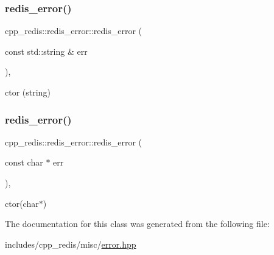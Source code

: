 \subsubsection{\texorpdfstring{redis\+\_\+error()}{redis\_error()}\hspace{0.1cm}{\footnotesize\ttfamily [1/2]}}
{\footnotesize\ttfamily cpp\+\_\+redis\+::redis\+\_\+error\+::redis\+\_\+error (\begin{DoxyParamCaption}\item[{const std\+::string \&}]{err }\end{DoxyParamCaption})\hspace{0.3cm}{\ttfamily [inline]}, {\ttfamily [explicit]}}



ctor (string) 

\mbox{\label{classcpp__redis_1_1redis__error_a0ced25483119c2318b1a5a69cac1919f}} 
\subsubsection{\texorpdfstring{redis\+\_\+error()}{redis\_error()}\hspace{0.1cm}{\footnotesize\ttfamily [2/2]}}
{\footnotesize\ttfamily cpp\+\_\+redis\+::redis\+\_\+error\+::redis\+\_\+error (\begin{DoxyParamCaption}\item[{const char $\ast$}]{err }\end{DoxyParamCaption})\hspace{0.3cm}{\ttfamily [inline]}, {\ttfamily [explicit]}}



ctor(char$\ast$) 



The documentation for this class was generated from the following file\+:\begin{DoxyCompactItemize}
\item 
includes/cpp\+\_\+redis/misc/\hyperlink{error_8hpp}{error.\+hpp}\end{DoxyCompactItemize}
